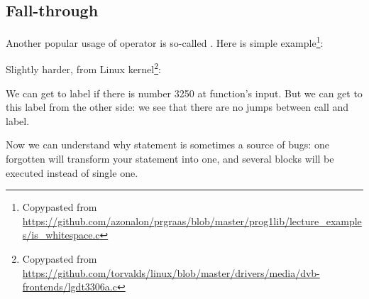 ﻿\subsection{Fall-through}

Another popular usage of  operator is so-called .
Here is simple example\footnote{Copypasted from \url{https://github.com/azonalon/prgraas/blob/master/prog1lib/lecture_examples/is_whitespace.c}}:



Slightly harder, from Linux kernel\footnote{Copypasted from \url{https://github.com/torvalds/linux/blob/master/drivers/media/dvb-frontends/lgdt3306a.c}}:





We can get to  label if there is number 3250 at function's input.
But we can get to this label from the other side:
we see that there are no jumps between \printf call and  label.

Now we can understand why  statement is sometimes a source of bugs:
one forgotten  will transform your
 statement into  one, and several blocks will be executed instead of single one.

